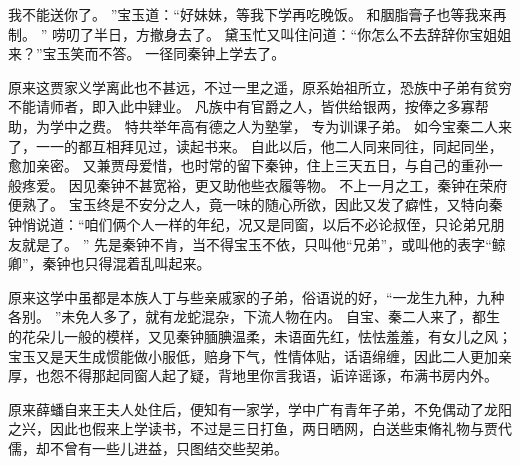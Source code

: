 我不能送你了。
”宝玉道：“好妹妹，等我下学再吃晚饭。
和胭脂膏子也等我来再制。
” 唠叨了半日，方撤身去了。
黛玉忙又叫住问道：“你怎么不去辞辞你宝姐姐来？”宝玉笑而不答。
一径同秦钟上学去了。
\par
原来这贾家义学离此也不甚远，不过一里之遥，原系始祖所立，恐族中子弟有贫穷不能请师者，即入此中肄业。
凡族中有官爵之人，皆供给银两，按俸之多寡帮助，为学中之费。
特共举年高有德之人为塾掌，
专为训课子弟。
如今宝秦二人来了，一一的都互相拜见过，读起书来。
自此以后，他二人同来同往，同起同坐，愈加亲密。
又兼贾母爱惜，也时常的留下秦钟，住上三天五日，与自己的重孙一般疼爱。
因见秦钟不甚宽裕，更又助他些衣履等物。
不上一月之工，秦钟在荣府便熟了。
宝玉终是不安分之人，竟一味的随心所欲，因此又发了癖性，又特向秦钟悄说道：“咱们俩个人一样的年纪，况又是同窗，以后不必论叔侄，只论弟兄朋友就是了。
”
先是秦钟不肯，当不得宝玉不依，只叫他“兄弟”，或叫他的表字“鲸卿”，秦钟也只得混着乱叫起来。
\par
原来这学中虽都是本族人丁与些亲戚家的子弟，俗语说的好，“一龙生九种，九种各别。
”未免人多了，就有龙蛇混杂，下流人物在内。
自宝、秦二人来了，都生的花朵儿一般的模样，又见秦钟腼腆温柔，未语面先红，怯怯羞羞，有女儿之风；宝玉又是天生成惯能做小服低，赔身下气，性情体贴，话语绵缠，因此二人更加亲厚，也怨不得那起同窗人起了疑，背地里你言我语，诟谇谣诼，布满书房内外。
\par
原来薛蟠自来王夫人处住后，便知有一家学，学中广有青年子弟，不免偶动了龙阳之兴，因此也假来上学读书，不过是三日打鱼，两日晒网，白送些束脩礼物与贾代儒，却不曾有一些儿进益，只图结交些契弟。
